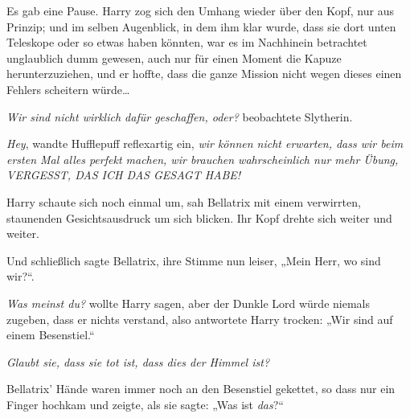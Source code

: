 Es gab eine Pause. Harry zog sich den Umhang wieder über den Kopf, nur aus Prinzip; und im selben Augenblick, in dem ihm klar wurde, dass sie dort unten Teleskope oder so etwas haben könnten, war es im Nachhinein betrachtet unglaublich dumm gewesen, auch nur für einen Moment die Kapuze herunterzuziehen, und er hoffte, dass die ganze Mission nicht wegen dieses einen Fehlers scheitern würde…

\emph{Wir sind nicht wirklich dafür geschaffen, oder?} beobachtete Slytherin.

\emph{Hey}, wandte Hufflepuff reflexartig ein, \emph{wir können nicht erwarten, dass wir beim ersten Mal alles perfekt machen, wir brauchen wahrscheinlich nur mehr Übung, VERGESST, DAS ICH DAS GESAGT HABE!}

Harry schaute sich noch einmal um, sah Bellatrix mit einem verwirrten, staunenden Gesichtsausdruck um sich blicken. Ihr Kopf drehte sich weiter und weiter.

Und schließlich sagte Bellatrix, ihre Stimme nun leiser,
„Mein Herr, wo sind wir?“.

\emph{Was meinst du?} wollte Harry sagen, aber der Dunkle Lord würde niemals zugeben, dass er nichts verstand, also antwortete Harry trocken:
„Wir sind auf einem Besenstiel.“

\emph{Glaubt sie, dass sie tot ist, dass dies der Himmel ist?}

Bellatrix’ Hände waren immer noch an den Besenstiel gekettet, so dass nur ein Finger hochkam und zeigte, als sie sagte:
„Was ist \emph{das}?“

